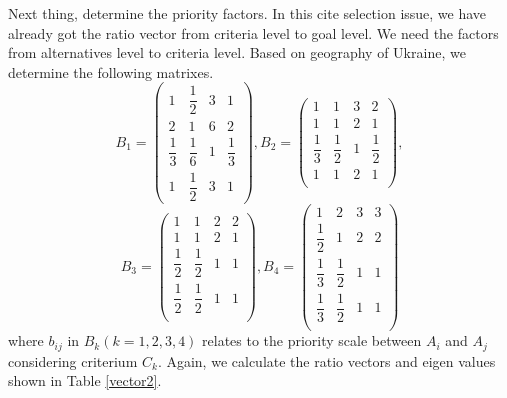 Next thing, determine the priority factors. In this cite selection issue, we have already got the ratio vector from criteria level to goal level. We need the factors from alternatives level to criteria level. Based on geography of Ukraine, we determine the following matrixes.
\begin{equation}
B_1=\left(\begin{array}{cccc}
        1 & \dfrac{1}{2} & 3 & 1 \\[2ex]
        2 & 1 & 6 & 2 \\
        \dfrac{1}{3} & \dfrac{1}{6} & 1 & \dfrac{1}{3} \\[2ex]
        1 & \dfrac{1}{2} & 3 & 1
        \end{array}\right),
B_2=\left(
      \begin{array}{cccc}
        1 & 1 & 3 & 2 \\
        1 & 1 & 2 & 1 \\
        \dfrac{1}{3} & \dfrac{1}{2} & 1 & \dfrac{1}{2} \\[2ex]
        1 & 1 & 2 & 1 \\
      \end{array}
    \right),
\end{equation}
\begin{equation}
B_3=\left(
      \begin{array}{cccc}
        1 & 1 & 2 & 2 \\
        1 & 1 & 2 & 1 \\
        \dfrac{1}{2} & \dfrac{1}{2} & 1 & 1 \\[2ex]
        \dfrac{1}{2} & \dfrac{1}{2} & 1 & 1 \\
      \end{array}
    \right),
B_4=\left(
      \begin{array}{cccc}
        1 & 2 & 3 & 3 \\
        \dfrac{1}{2} & 1 & 2 & 2 \\
        \dfrac{1}{3} & \dfrac{1}{2} & 1 & 1 \\[2ex]
        \dfrac{1}{3} & \dfrac{1}{2} & 1 & 1 \\
      \end{array}
    \right)
\end{equation}
where $b_{ij}$ in $B_k(k=1,2,3,4)$ relates to the priority scale between $A_i$ and $A_j$ considering criterium $C_k$. Again, we calculate the ratio vectors and eigen values shown in Table \ref{vector2}.
